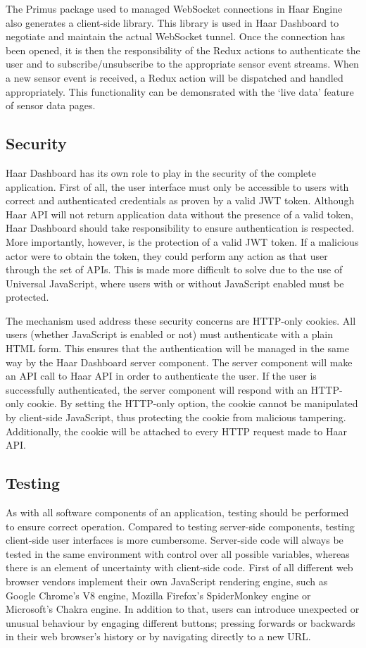       The Primus package used to managed WebSocket connections in Haar Engine also generates a client-side library. This library is used in Haar Dashboard to negotiate and maintain the actual WebSocket tunnel. Once the connection has been opened, it is then the responsibility of the Redux actions to authenticate the user and to subscribe/unsubscribe to the appropriate sensor event streams. When a new sensor event is received, a Redux action will be dispatched and handled appropriately. This functionality can be demonsrated with the `live data' feature of sensor data pages.

    \subsection{Security}
      Haar Dashboard has its own role to play in the security of the complete application. First of all, the user interface must only be accessible to users with correct and authenticated credentials as proven by a valid JWT token. Although Haar API will not return application data without the presence of a valid token, Haar Dashboard should take responsibility to ensure authentication is respected. More importantly, however, is the protection of a valid JWT token. If a malicious actor were to obtain the token, they could perform any action as that user through the set of APIs. This is made more difficult to solve due to the use of Universal JavaScript, where users with or without JavaScript enabled must be protected.

      The mechanism used address these security concerns are HTTP-only cookies. All users (whether JavaScript is enabled or not) must authenticate with a plain HTML form. This ensures that the authentication will be managed in the same way by the Haar Dashboard server component. The server component will make an API call to Haar API in order to authenticate the user. If the user is successfully authenticated, the server component will respond with an HTTP-only cookie. By setting the HTTP-only option, the cookie cannot be manipulated by client-side JavaScript, thus protecting the cookie from malicious tampering. Additionally, the cookie will be attached to every HTTP request made to Haar API.

    \subsection{Testing}
      As with all software components of an application, testing should be performed to ensure correct operation. Compared to testing server-side components, testing client-side user interfaces is more cumbersome. Server-side code will always be tested in the same environment with control over all possible variables, whereas there is an element of uncertainty with client-side code. First of all different web browser vendors implement their own JavaScript rendering engine, such as Google Chrome's V8 engine, Mozilla Firefox's SpiderMonkey engine or Microsoft's Chakra engine. In addition to that, users can introduce unexpected or unusual behaviour by engaging different buttons; pressing forwards or backwards in their web browser's history or by navigating directly to a new URL.

